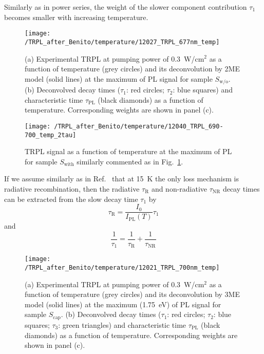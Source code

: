 Similarly as in power series, the weight of the slower component contribution $\tau_1$ becomes smaller with increasing temperature.
%
\begin{figure}
	\centering
	\texttt{[image: /TRPL\_after\_Benito/temperature/12027\_TRPL\_677nm\_temp]}
	\caption{(a) Experimental TRPL at pumping power of 0.3~W/cm$^2$ as a function of temperature (grey circles) and its deconvolution by 2ME model (solid lines) at the maximum of PL signal for sample $S_\mathrm{w/o}$. (b) Deconvolved decay times ($\tau_1$: red circles; $\tau_2$: blue squares) and characteristic time $\tau_\mathrm{PL}$ (black diamonds) as a function of temperature. Corresponding weights are shown in panel (c).}
	\label{fig:TRPL_temp_wo}
\end{figure}
%
\begin{figure}
	\centering
	\texttt{[image: /TRPL\_after\_Benito/temperature/12040\_TRPL\_690-700\_temp\_2tau]}
	\caption{TRPL signal as a function of temperature at the maximum of PL for sample $S_\mathrm{with}$ similarly commented as in Fig.~\ref{fig:TRPL_temp_wo}.}
	\label{fig:TRPL_temp_w}
\end{figure}
%

If we assume similarly as in Ref.~\citep{t_alvarez} that at 15~K the only loss mechanism is radiative recombination, then the radiative $\tau_\mathrm{R}$ and non-radiative $\tau_\mathrm{NR}$ decay times can be extracted from the slow decay time $\tau_1$ by
%
\begin{equation}
\tau_\mathrm{R}=\frac{I_0}{I_\mathrm{PL}(T)}\tau_1 \label{eq:tau_R_fromtau1}
\end{equation}
and
\begin{equation}
\frac{1}{\tau_1}=\frac{1}{\tau_\mathrm{R}} + \frac{1}{\tau_\mathrm{NR}}
\end{equation}
%
\begin{figure}
	\centering
	\texttt{[image: /TRPL\_after\_Benito/temperature/12021\_TRPL\_700nm\_temp]}
	\caption{(a) Experimental TRPL at pumping power of 0.3~W/cm$^2$ as a function of temperature (grey circles) and its deconvolution by 3ME model (solid lines) at the maximum (1.75~eV) of PL signal for sample $S_\mathrm{cap}$. (b) Deconvolved decay times ($\tau_1$: red circles; $\tau_2$: blue squares; $\tau_3$: green triangles) and characteristic time $\tau_\mathrm{PL}$ (black diamonds) as a function of temperature. Corresponding weights are shown in panel (c).}
	\label{fig:TRPL_temp_c}
\end{figure}
%

